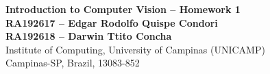 \documentclass[10pt, a4paper]{article}
\begin{document}
\begin{center}

\textbf{Introduction to Computer Vision -- Homework 1} \\[0.1cm]

\textbf{RA192617 -- Edgar Rodolfo Quispe Condori} \\[0.1cm]
\textbf{RA192618 -- Darwin Ttito Concha} \\[0.1cm]

Institute of Computing, University of Campinas (UNICAMP) \\
Campinas-SP, Brazil, 13083-852 \\
\end{center}



\end{document}

